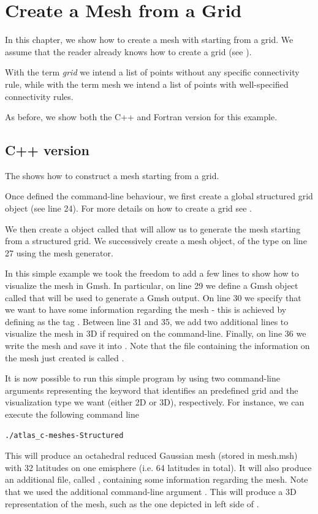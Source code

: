 \chapter{Create a Mesh from a Grid}
In this chapter, we show how to create a mesh with \Atlas 
starting from a grid. We assume that the reader already 
knows how to create a grid (see ). 
% 
\begin{notebox}
With the term \textit{grid} we intend a list of points 
without any specific connectivity rule, while with the 
term mesh we intend a list of points with well-specified 
connectivity rules.
\end{notebox}
%
As before, we show both the C++ and Fortran version 
for this example.


\section{C++ version}
The  shows how to construct a mesh 
starting from a grid.
%

%
Once defined the command-line behaviour, we first create 
a global structured grid object (see line 24). For more 
details on how to create a grid see .

We then create a 
 object called 
that will allow us to generate the mesh starting from
a structured grid.
We successively create a mesh object,  
of the  type on line 27 using the mesh generator.

In this simple example we took the freedom to add a few 
lines to show how to visualize the mesh in Gmsh. In particular, 
on line 29 we define a Gmsh object called  that 
will be used to generate a Gmsh output. On line 30 we specify 
that we want to have some information regarding the mesh - this 
is achieved by defining as  the tag .
Between line 31 and 35, we add two additional lines to visualize 
the mesh in 3D if required on the command-line.
Finally, on line 36 we write the mesh and save it into .
Note that the file containing the information on the mesh 
just created is called .

It is now possible to run this simple program by using 
two command-line arguments representing the keyword that 
identifies an \Atlas predefined grid and the visualization 
type we want (either 2D or 3D), respectively. For instance, 
we can execute the following command line
%
\begin{lstlisting}[style=BashStyle]
./atlas_c-meshes-Structured
\end{lstlisting}
% 
This will produce an octahedral reduced Gaussian mesh 
(stored in mesh.msh) with 32 latitudes on one emisphere 
(i.e. 64 latitudes in total). It will also produce an 
additional file, called , containing
some information regarding the mesh.
Note that we used the additional command-line argument 
. This will produce a 3D representation 
of the mesh, such as the one depicted in left side of 
.

